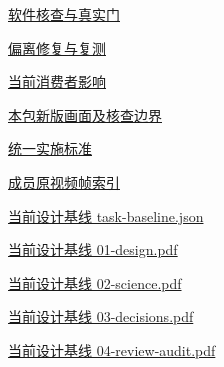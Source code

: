 \documentclass[11pt,a4paper]{article}
\begin{document}
\href{file:///D:/Agent/srp/agent/tasks/Z-01/evidence/verification.json}{软件核查与真实门}


\href{file:///D:/Agent/srp/agent/tasks/Z-01/evidence/failure-disposition.md}{偏离修复与复测}


\href{file:///D:/Agent/srp/agent/tasks/Z-01/evidence/consumer-impact.md}{当前消费者影响}


\href{file:///D:/Agent/srp/agent/tasks/Z-01/outputs/current-implementation-evidence.md}{本包新版画面及核查边界}


\href{file:///D:/Agent/srp/agent/design/weather/2026-10-08_Storm\%E4\%B8\%8E\%E7\%BA\%AF\%E7\%B2\%92\%E5\%AD\%90\%E5\%8F\%8C\%E7\%8E\%AF\%E5\%AE\%9E\%E6\%96\%BD\%E6\%A0\%87\%E5\%87\%86.md}{统一实施标准}


\href{file:///D:/Agent/srp/human/assets/previews/2026-10-08/member-storm-particle-rings/frame-index.json}{成员原视频帧索引}


\href{file:///D:/Agent/srp/agent/design/design-foundation-20261008/task-baseline.json}{当前设计基线 task-\allowbreak{}baseline.json}


\href{file:///D:/Agent/srp/agent/design/design-foundation-20261008/01-design.pdf}{当前设计基线 01-\allowbreak{}design.pdf}


\href{file:///D:/Agent/srp/agent/design/design-foundation-20261008/02-science.pdf}{当前设计基线 02-\allowbreak{}science.pdf}


\href{file:///D:/Agent/srp/agent/design/design-foundation-20261008/03-decisions.pdf}{当前设计基线 03-\allowbreak{}decisions.pdf}


\href{file:///D:/Agent/srp/agent/design/design-foundation-20261008/04-review-audit.pdf}{当前设计基线 04-\allowbreak{}review-\allowbreak{}audit.pdf}
\end{document}
